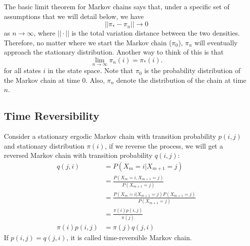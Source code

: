 The basic limit theorem for Markov chains says that, under a specific set of assumptions that we will detail below, we have 
$$||\pi_*-\pi_n|| \to 0$$
as $n\to\infty$, where $||\cdot||$ is the total variation distance between the two densities. Therefore, no matter where we start the Markov chain ($\pi_0$), $\pi_n$ will eventually approach the stationary distribution. Another way to think of this is that 
$$\lim_{n\to\infty}\pi_n(i)=\pi_*(i).$$
for all states $i$ in the state space. Note that $\pi_0$ is the probability distribution of the Markov chain at time 0. Also, $\pi_n$ denote the distribution of the chain at time $n$.


\subsection{Time Reversibility}
Consider a stationary ergodic Markov chain with transition probability $p(i, j)$ and stationary distribution $\pi(i)$, if we reverse the process, we will get a reversed Markov chain with transition probability $q(i, j)$: 
\begin{align*}
	q(j,i) &= P(X_m=i|X_{m+1}=j)\\
		   &= \frac{P(X_m=i,X_{m+1}=j)}{P(X_{m+1}=j)}\\
		   &= \frac{P(X_m=i|X_{m+1}=j)P(X_{m+1}=j)}{P(X_{m+1}=j)}\\
		   &= \frac{\pi(i)p(i,j)}{\pi(j)}\\
	\pi(i)p(i,j) &= \pi(j)q(j,i)
\end{align*}
If $p(i,j) = q(j,i)$, it is called time-reversible Markov chain. 


